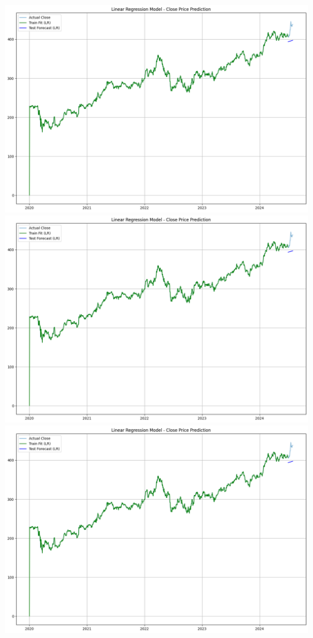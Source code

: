 \documentclass[conference]{IEEEtran}
\begin{document}
\begin{itemize}
    \\
     \includegraphics[scale=0.125]{screenshots/linreg.png} %
      \includegraphics[scale=0.125]{screenshots/linreg.png} %
       \includegraphics[scale=0.125]{screenshots/linreg.png} %

\end{itemize}
\end{document}
